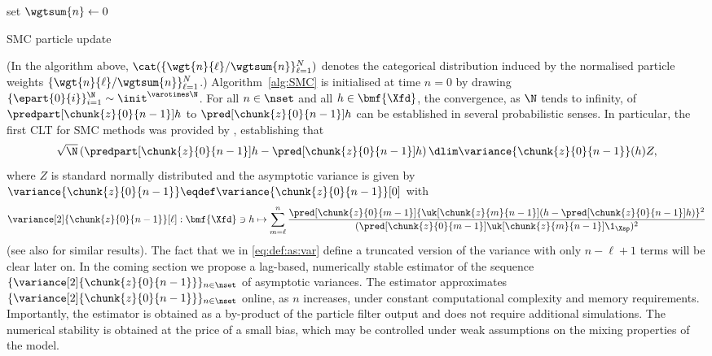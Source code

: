 \bigskip
\begin{algorithm}[H] \label{alg:SMC}
    set $\wgtsum{n} \gets 0$\;
    \caption{SMC particle update}
\end{algorithm}
\bigskip
(In the algorithm above, $\cat( \{ \wgt{n}{\ell} / \wgtsum{n} \}_{\ell = 1}^N)$ denotes the categorical distribution induced by the normalised particle weights $\{ \wgt{n}{\ell} / \wgtsum{n} \}_{\ell = 1}^N$.) Algorithm~\ref{alg:SMC} is initialised at time $n = 0$ by drawing $\{ \epart{0}{i} \}_{i = 1}^\N \sim \init^{\varotimes \N}$. For all $n \in \nset$ and all $h \in \bmf{\Xfd}$, the convergence, as $\N$ tends to infinity, of $\predpart[\chunk{z}{0}{n - 1}] h$ to $\pred[\chunk{z}{0}{n - 1}] h$ can be established in several probabilistic senses. In particular, the first CLT for SMC methods was provided by \cite{delmoral:guionnet:1999}, establishing that 
\begin{equation} \label{eq:CLT}
\sqrt{\N} \left( \predpart[\chunk{z}{0}{n - 1}] h - \pred[\chunk{z}{0}{n - 1}] h \right) \dlim \variance{\chunk{z}{0}{n - 1}}(h) Z,  
\end{equation}
where $Z$ is standard normally distributed and the asymptotic variance is given by $\variance{\chunk{z}{0}{n - 1}} \eqdef \variance{\chunk{z}{0}{n - 1}}[0]$ with 
\begin{equation} \label{eq:def:as:var}
\variance[2]{\chunk{z}{0}{n - 1}}[\ell] : \bmf{\Xfd} \ni h \mapsto \sum_{m = \ell}^n \frac{\pred[\chunk{z}{0}{m - 1}] \{ \uk[\chunk{z}{m}{n - 1}](h - \pred[\chunk{z}{0}{n - 1}] h) \}^2 }{(\pred[\chunk{z}{0}{m - 1}] \uk[\chunk{z}{m}{n - 1}] \1_{\Xsp})^2}
\end{equation}
(see also \cite{chopin:2004,kuensch:2005,douc:moulines:2008} for similar results). The fact that we in \eqref{eq:def:as:var} define a truncated version of the variance with only $n - \ell + 1$ terms will be clear later on. In the coming section we propose a lag-based, numerically stable estimator of the sequence $\{ \variance[2]{\chunk{z}{0}{n - 1}} \}_{n \in \nset}$ of asymptotic variances. The estimator approximates $\{\variance[2]{\chunk{z}{0}{n - 1}} \}_{n \in \nset}$ online, as $n$ increases, under constant computational complexity and memory requirements. Importantly, the estimator is obtained as a by-product of the particle filter output and does not require additional simulations. The numerical stability is obtained at the price of a small bias, which may be controlled under weak assumptions on the mixing properties of the model. 
